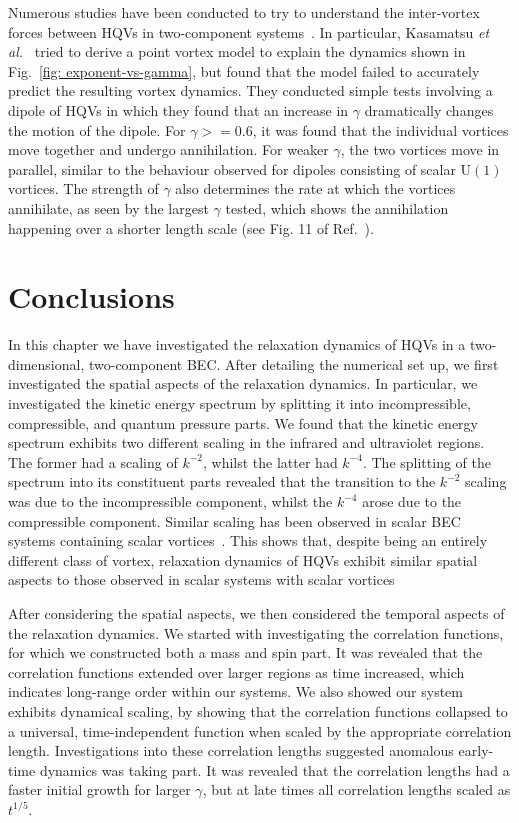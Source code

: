 Numerous studies have been conducted to try to understand the inter-vortex
forces between HQVs in two-component systems~\cite{Eto2011, Kasamatsu2016}.
In particular, Kasamatsu \textit{et al.}~\cite{Kasamatsu2016} tried to derive a
point vortex model to explain the dynamics shown in
Fig.~\ref{fig: exponent-vs-gamma}, but found that the model failed to accurately
predict the resulting vortex dynamics.
They conducted simple tests involving a dipole of HQVs in which they found that
an increase in \(\gamma \) dramatically changes the motion of the dipole.
For \(\gamma>=0.6\), it was found that the individual vortices move together and
undergo annihilation.
For weaker \(\gamma \), the two vortices move in parallel, similar to
the behaviour observed for dipoles consisting of scalar \(\mathrm{U}(1)\)
vortices.
The strength of \(\gamma \) also determines the rate at which the vortices
annihilate, as seen by the largest \(\gamma \) tested, which shows the
annihilation happening over a shorter length scale (see Fig. 11 of
Ref.~\cite{Kasamatsu2016}).

\section{Conclusions}
In this chapter we have investigated the relaxation dynamics of HQVs in a
two-dimensional, two-component BEC\@.
After detailing the numerical set up, we first investigated the spatial aspects
of the relaxation dynamics.
In particular, we investigated the kinetic energy spectrum by splitting it
into incompressible, compressible, and quantum pressure parts.
We found that the kinetic energy spectrum exhibits two different scaling in the
infrared and ultraviolet regions.
The former had a scaling of \(k^{-2}\), whilst the latter had \(k^{-4}\).
The splitting of the spectrum into its constituent parts revealed that the
transition to the \(k^{-2}\) scaling was due to the incompressible component,
whilst the \(k^{-4}\) arose due to the compressible component.
Similar scaling has been observed in scalar BEC systems containing scalar
vortices~\cite{Nowak2012}.
This shows that, despite being an entirely different class of vortex, relaxation
dynamics of HQVs exhibit similar spatial aspects to those observed in scalar
systems with scalar vortices

After considering the spatial aspects, we then considered the temporal aspects
of the relaxation dynamics.
We started with investigating the correlation functions, for which we
constructed both a mass and spin part.
It was revealed that the correlation functions extended over larger regions as
time increased, which indicates long-range order within our systems.
We also showed our system exhibits dynamical scaling, by showing that the
correlation functions collapsed to a universal, time-independent function when
scaled by the appropriate correlation length.
Investigations into these correlation lengths suggested anomalous early-time
dynamics was taking part.
It was revealed that the correlation lengths had a faster initial growth for
larger \(\gamma \), but at late times all correlation lengths scaled as
\(t^{1/5}\).

